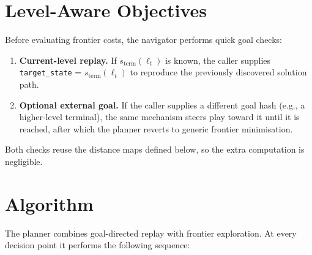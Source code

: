 \documentclass[11pt]{article}
\begin{document}
\section{Level-Aware Objectives}

Before evaluating frontier costs, the navigator performs quick goal checks:
\begin{enumerate}
    \item \textbf{Current-level replay.} If $s_{\mathrm{term}}(\ell_t)$ is known, the caller supplies \texttt{target\_state} = $s_{\mathrm{term}}(\ell_t)$ to reproduce the previously discovered solution path.
    \item \textbf{Optional external goal.} If the caller supplies a different goal hash (e.g., a higher-level terminal), the same mechanism steers play toward it until it is reached, after which the planner reverts to generic frontier minimisation.
\end{enumerate}
Both checks reuse the distance maps defined below, so the extra computation is negligible.

\section{Algorithm}

The planner combines goal-directed replay with frontier exploration. At every decision point it performs the following sequence:
\end{document}
